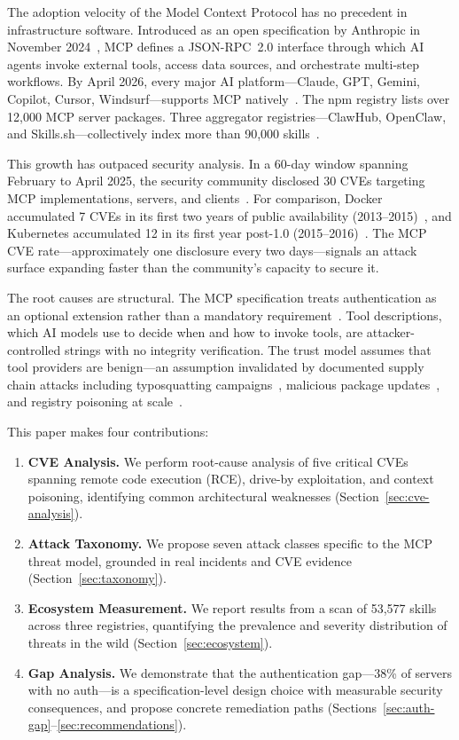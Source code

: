 \documentclass[11pt,twocolumn]{article}
\begin{document}
The adoption velocity of the Model Context Protocol has no precedent in infrastructure software. Introduced as an open specification by Anthropic in November 2024~\cite{mcp-spec}, MCP defines a JSON-RPC~2.0 interface through which AI agents invoke external tools, access data sources, and orchestrate multi-step workflows. By April 2026, every major AI platform---Claude, GPT, Gemini, Copilot, Cursor, Windsurf---supports MCP natively~\cite{mcp-adoption}. The npm registry lists over 12,000 MCP server packages. Three aggregator registries---ClawHub, OpenClaw, and Skills.sh---collectively index more than 90,000 skills~\cite{atr-scan}.

This growth has outpaced security analysis. In a 60-day window spanning February to April 2025, the security community disclosed 30 CVEs targeting MCP implementations, servers, and clients~\cite{cve-list}. For comparison, Docker accumulated 7 CVEs in its first two years of public availability (2013--2015)~\cite{docker-cves}, and Kubernetes accumulated 12 in its first year post-1.0 (2015--2016)~\cite{k8s-cves}. The MCP CVE rate---approximately one disclosure every two days---signals an attack surface expanding faster than the community's capacity to secure it.

The root causes are structural. The MCP specification treats authentication as an optional extension rather than a mandatory requirement~\cite{mcp-spec}. Tool descriptions, which AI models use to decide when and how to invoke tools, are attacker-controlled strings with no integrity verification. The trust model assumes that tool providers are benign---an assumption invalidated by documented supply chain attacks including typosquatting campaigns~\cite{sandworm}, malicious package updates~\cite{postmark}, and registry poisoning at scale~\cite{antiy-cert}.

This paper makes four contributions:

\begin{enumerate}[leftmargin=*]
    \item \textbf{CVE Analysis.} We perform root-cause analysis of five critical CVEs spanning remote code execution (RCE), drive-by exploitation, and context poisoning, identifying common architectural weaknesses (Section~\ref{sec:cve-analysis}).
    \item \textbf{Attack Taxonomy.} We propose seven attack classes specific to the MCP threat model, grounded in real incidents and CVE evidence (Section~\ref{sec:taxonomy}).
    \item \textbf{Ecosystem Measurement.} We report results from a scan of 53,577 skills across three registries, quantifying the prevalence and severity distribution of threats in the wild (Section~\ref{sec:ecosystem}).
    \item \textbf{Gap Analysis.} We demonstrate that the authentication gap---38\% of servers with no auth---is a specification-level design choice with measurable security consequences, and propose concrete remediation paths (Sections~\ref{sec:auth-gap}--\ref{sec:recommendations}).
\end{enumerate}
\end{document}
